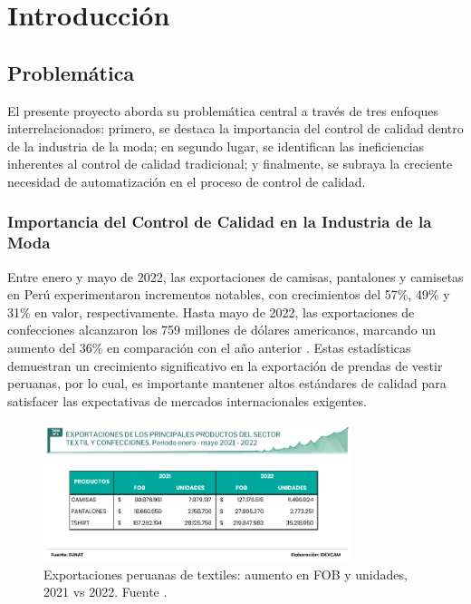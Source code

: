 
\chapter{Introducción}
\section{Problemática}

El presente proyecto aborda su problemática central a través de tres enfoques interrelacionados: primero, se destaca la importancia del control de calidad dentro de la industria de la moda; en segundo lugar, se identifican las ineficiencias inherentes al control de calidad tradicional; y finalmente, se subraya la creciente necesidad de automatización en el proceso de control de calidad.

\subsection*{Importancia del Control de Calidad en la Industria de la Moda}

Entre enero y mayo de 2022, las exportaciones de camisas, pantalones y camisetas en Perú experimentaron incrementos notables, con crecimientos del 57\%, 49\% y 31\% en valor, respectivamente. Hasta mayo de 2022, las exportaciones de confecciones alcanzaron los 759 millones de dólares americanos, marcando un aumento del 36\% en comparación con el año anterior \cite{LaCamara2022}. Estas estadísticas demuestran un crecimiento significativo en la exportación de prendas de vestir peruanas, por lo cual, es importante mantener altos estándares de calidad para satisfacer las expectativas de mercados internacionales exigentes.

\begin{figure}[H]
	\centering
	\includegraphics[width=0.8\textwidth]{img/exportaciones.jpg}
	\caption[Exportaciones peruanas de textiles: aumento en FOB y unidades, 2021 vs 2022.]{Exportaciones peruanas de textiles: aumento en FOB y unidades, 2021 vs 2022. Fuente \cite{LaCamara2022}.}
\end{figure}

